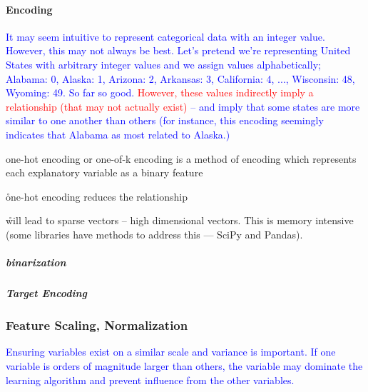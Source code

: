 \paragraph{Encoding}


\textcolor{blue}{It may seem intuitive to represent categorical data with an integer value. However, this may not always be best. Let's pretend we're representing United States with arbitrary integer values and we assign values alphabetically; Alabama: 0, Alaska: 1, Arizona: 2, Arkansas: 3, California: 4, ..., Wisconsin: 48, Wyoming: 49. So far so good. \textcolor{red}{However, these values indirectly imply a relationship (that may not actually exist)} -- and imply that some states are more similar to one another than others (for instance, this encoding seemingly indicates that Alabama as most related to Alaska.) }

\r{{one-hot encoding} or one-of-k encoding is a method of encoding which represents each explanatory variable as a binary feature}

\r{one-hot encoding reduces the relationship}


\r{will lead to {sparse vectors} -- high dimensional vectors. This is memory intensive (some libraries have methods to address this --- SciPy and Pandas).}

\subparagraph{binarization}



\subparagraph{Target Encoding}


\subsubsection{Feature Scaling, Normalization}


\textcolor{blue}{Ensuring variables exist on a similar scale and variance is important. If one variable is orders of magnitude larger than others, the variable may dominate the learning algorithm and prevent influence from the other variables.}

